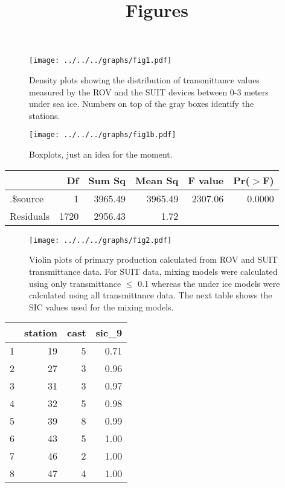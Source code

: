 \documentclass[12pt,a4paper]{scrartcl}
\title{Figures}
\date{}
\begin{document}
\maketitle

\begin{figure}[h]
	\centering
	\texttt{[image: ../../../graphs/fig1.pdf]}
	\caption{Density plots showing the distribution of transmittance values measured by the ROV and the SUIT devices between 0-3 meters under sea ice. Numbers on top of the gray boxes identify the stations.}
\end{figure}

\clearpage
\newpage

\begin{figure}[h]
	\centering
	\texttt{[image: ../../../graphs/fig1b.pdf]}
	\caption{Boxplots, just an idea for the moment.}
\end{figure}

\begin{table}[ht]
	\centering
	\begin{tabular}{lrrrrr}
		\hline
		          & Df   & Sum Sq  & Mean Sq & F value & Pr($>$F) \\
		\hline
		.\$source & 1    & 3965.49 & 3965.49 & 2307.06 & 0.0000   \\
		Residuals & 1720 & 2956.43 & 1.72    &         &          \\
		\hline
	\end{tabular}
\end{table}

\clearpage
\newpage

\begin{figure}[h]
	\centering
	\texttt{[image: ../../../graphs/fig2.pdf]}
	\caption{Violin plots of primary production calculated from ROV and SUIT transmittance data. For SUIT data, mixing models were calculated using only transmittance $\le$ 0.1 whereas the under ice models were calculated using all transmittance data.	The next table shows the SIC values used for the mixing models.}
\end{figure}

\begin{table}[ht]
	\footnotesize
	\centering
	\begin{tabular}{rrrr}
		\hline
		  & station & cast & sic\_9 \\
		\hline
		1 & 19      & 5    & 0.71   \\
		2 & 27      & 3    & 0.96   \\
		3 & 31      & 3    & 0.97   \\
		4 & 32      & 5    & 0.98   \\
		5 & 39      & 8    & 0.99   \\
		6 & 43      & 5    & 1.00   \\
		7 & 46      & 2    & 1.00   \\
		8 & 47      & 4    & 1.00   \\
		\hline
	\end{tabular}
\end{table}
\end{document}
